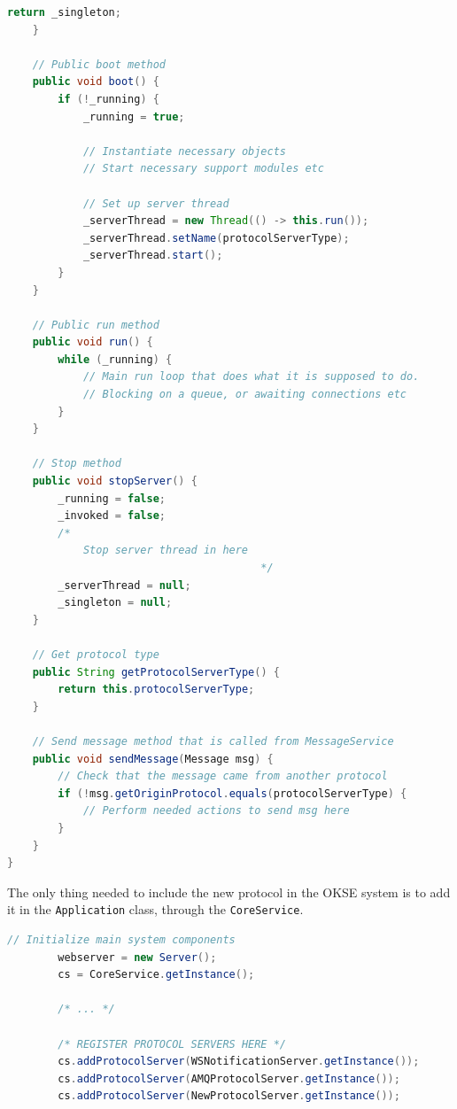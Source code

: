 \begin{lstlisting}[language=Java, captionpos=b, caption=Adding a new protocol, frame=bt, showstringspaces=false]
        return _singleton;
    }
    
    // Public boot method
    public void boot() {
        if (!_running) {
            _running = true;
            
            // Instantiate necessary objects
            // Start necessary support modules etc
            
            // Set up server thread
            _serverThread = new Thread(() -> this.run());
            _serverThread.setName(protocolServerType);
            _serverThread.start();
        }
    }
    
    // Public run method
    public void run() {
        while (_running) {
            // Main run loop that does what it is supposed to do.
            // Blocking on a queue, or awaiting connections etc
        }
    }
    
    // Stop method
    public void stopServer() {
        _running = false;
        _invoked = false;
        /*
            Stop server thread in here
                                        */
        _serverThread = null;
        _singleton = null;
    }
    
    // Get protocol type
    public String getProtocolServerType() {
        return this.protocolServerType;
    }
    
    // Send message method that is called from MessageService
    public void sendMessage(Message msg) {
        // Check that the message came from another protocol
        if (!msg.getOriginProtocol.equals(protocolServerType) {
            // Perform needed actions to send msg here
        }
    }
}
\end{lstlisting}

The only thing needed to include the new protocol in the OKSE system is to add it in the \verb!Application! class, through the \verb!CoreService!.

\begin{lstlisting}[language=Java, captionpos=b, caption=Registering a new protocol, frame=bt, showstringspaces=false]
        // Initialize main system components
        webserver = new Server();
        cs = CoreService.getInstance();

        /* ... */

        /* REGISTER PROTOCOL SERVERS HERE */
        cs.addProtocolServer(WSNotificationServer.getInstance());
        cs.addProtocolServer(AMQProtocolServer.getInstance());
        cs.addProtocolServer(NewProtocolServer.getInstance());
\end{lstlisting}

